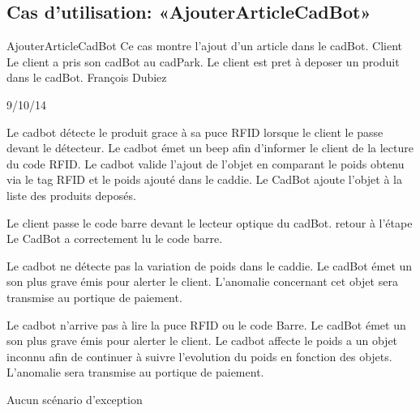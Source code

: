 \subsection{Cas d'utilisation: «AjouterArticleCadBot» }

\startCU
\nom AjouterArticleCadBot
\but Ce cas montre l'ajout d'un article dans le cadBot.
\acteur Client
\precondition Le client a pris son cadBot au cadPark.
\declenchement Le client est pret à deposer un produit dans le cadBot.
\auteur François Dubiez
\date 29/10/14

\nominal %
\startnominal
\etape[SA1] Le cadbot détecte le produit grace à sa puce RFID lorsque le client le passe devant le détecteur. 
\etape[RETOUR] Le cadbot émet un beep afin d'informer le client de la lecture du code RFID.
\etape[SE1] Le cadbot valide l'ajout de l'objet en comparant le poids obtenu via le tag RFID et  le poids ajouté dans le caddie.
\stopnominal
\postcondition Le CadBot ajoute l'objet à la liste des produits deposés.

\alternatifs %
\startalternatif[SA1] %
  \etape[SE1] Le client passe le code barre devant le lecteur optique du cadBot.
  \etape retour à l'étape \in[RETOUR]
\stopcondition
\postcondition Le CadBot a correctement lu le code barre.
\stopalternatif

\startalternatif[SE1]
   \etape Le cadbot ne détecte pas la variation de poids dans le caddie.
   \etape Le cadBot émet un son plus grave émis pour alerter le client.
\stopcondition
\postcondition L'anomalie concernant cet objet sera transmise au portique de paiement.
\stopalternatif

\startalternatif[SA1]
   \etape Le cadbot n'arrive pas à lire la puce RFID ou le code Barre.
   \etape Le cadBot émet un son plus grave émis pour alerter le client.
   \etape Le cadbot affecte le poids a un objet inconnu afin de continuer à suivre l'evolution du poids en fonction des objets.
\stopcondition
\postcondition L'anomalie sera transmise au portique de paiement.
\stopalternatif

\exception %
Aucun scénario d'exception
\stopCU
